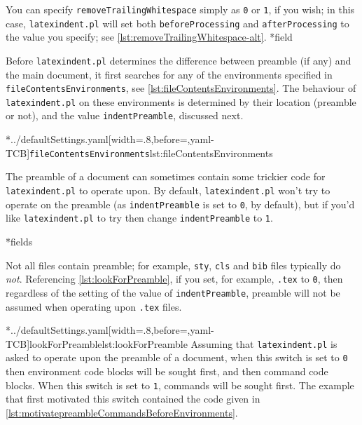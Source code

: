 	You can specify \texttt{removeTrailingWhitespace} simply as \texttt{0} or
	\texttt{1}, if you wish; in this case,%
	 \texttt{latexindent.pl} will set both \texttt{beforeProcessing} and
	\texttt{afterProcessing} to the value you specify; see \cref{lst:removeTrailingWhitespace-alt}.
*{field}

	Before \texttt{latexindent.pl} determines the difference between preamble (if any) and
	the main document, it first searches for any of the environments specified in
	\texttt{fileContentsEnvironments}, see \cref{lst:fileContentsEnvironments}. The behaviour of
	\texttt{latexindent.pl} on these environments is determined by their location (preamble
	or not), and the value \texttt{indentPreamble}, discussed next.

	\cmhlistingsfromfile[style=fileContentsEnvironments]*{../defaultSettings.yaml}[width=.8\linewidth,before=\centering,yaml-TCB]{\texttt{fileContentsEnvironments}}{lst:fileContentsEnvironments}


	The preamble of a document can sometimes contain some trickier code for
	\texttt{latexindent.pl} to operate upon. By default, \texttt{latexindent.pl} won't try to
	operate on the preamble (as \texttt{indentPreamble} is set to \texttt{0}, by
	default), but if you'd like \texttt{latexindent.pl} to try then change
	\texttt{indentPreamble} to \texttt{1}.

*{fields}

	Not all files contain preamble; for example, \texttt{sty},
	\texttt{cls} and \texttt{bib} files typically do
	\emph{not}. Referencing \cref{lst:lookForPreamble}, if you set, for example,
	\texttt{.tex} to \texttt{0}, then regardless of the setting of the
	value of \texttt{indentPreamble}, preamble will not be assumed when operating upon
	\texttt{.tex} files.

	\cmhlistingsfromfile[style=lookForPreamble]*{../defaultSettings.yaml}[width=.8\linewidth,before=\centering,yaml-TCB]{lookForPreamble}{lst:lookForPreamble}
	Assuming that \texttt{latexindent.pl} is asked to operate upon the preamble of a
	document, when this switch is set to \texttt{0} then environment code blocks
	will be sought first, and then command code blocks. When this switch is set to
	\texttt{1}, commands will be sought first. The example that first motivated
	this switch contained the code given in \cref{lst:motivatepreambleCommandsBeforeEnvironments}.

